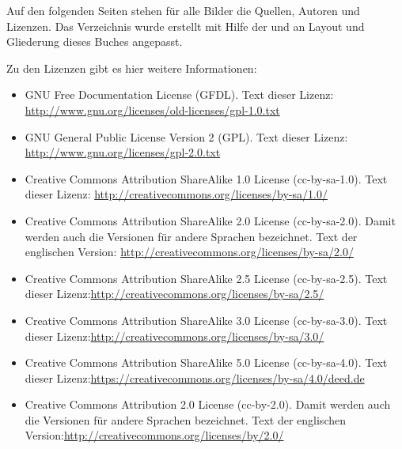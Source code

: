 \begin{small}
Auf den folgenden Seiten stehen für alle Bilder die Quellen, Autoren und Lizenzen. Das Verzeichnis wurde erstellt mit Hilfe der  und an Layout und Gliederung dieses Buches angepasst.

Zu den Lizenzen gibt es hier weitere Informationen:

\begin{itemize}
\item GNU Free Documentation License (GFDL). Text dieser Lizenz: \newline{}\url{http://www.gnu.org/licenses/old-licenses/gpl-1.0.txt}

\item GNU General Public License Version 2 (GPL). Text dieser Lizenz: \newline{}\url{http://www.gnu.org/licenses/gpl-2.0.txt} 

\item Creative Commons Attribution ShareAlike 1.0 License (cc-by-sa-1.0). Text dieser Lizenz: \newline{}\url{http://creativecommons.org/licenses/by-sa/1.0/} 

\item Creative Commons Attribution ShareAlike 2.0 License (cc-by-sa-2.0). Damit werden auch die Versionen f\"ur andere Sprachen bezeichnet. Text der englischen Version: \newline{}\url{http://creativecommons.org/licenses/by-sa/2.0/}

\item Creative Commons Attribution ShareAlike 2.5 License (cc-by-sa-2.5). Text dieser Lizenz:\newline{}\url{http://creativecommons.org/licenses/by-sa/2.5/}

\item Creative Commons Attribution ShareAlike 3.0 License (cc-by-sa-3.0). Text dieser Lizenz:\newline{}\url{http://creativecommons.org/licenses/by-sa/3.0/}

\item Creative Commons Attribution ShareAlike 5.0 License (cc-by-sa-4.0). Text dieser Lizenz:\newline{}\url{https://creativecommons.org/licenses/by-sa/4.0/deed.de}


\item Creative Commons Attribution 2.0 License (cc-by-2.0). Damit werden auch die Versionen f\"ur andere Sprachen bezeichnet. Text der englischen Version:\newline{}\url{http://creativecommons.org/licenses/by/2.0/}


\end{itemize}
\end{small}
